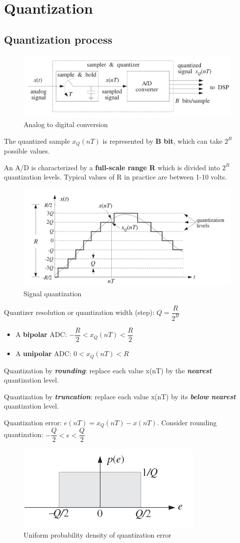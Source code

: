\section{Quantization}
\subsection{Quantization process}
\begin{figure}[h!]
    \centering
    \includegraphics[width=0.5\linewidth]{img/17.png}
    \caption{Analog to digital conversion}
\end{figure}
The quantized sample $x_Q(nT)$ is represented by \textbf{B bit}, which can take $2^B$ possible values. 

An A/D is characterized by a \textbf{full-scale range R} which is divided into $2^B$ quantization levels. Typical values of R in practice are between 1-10 volts.
\begin{figure}[h!]
    \centering
    \includegraphics[width=0.5\linewidth]{img/18.png}
    \caption{Signal quantization}
\end{figure}

Quantizer resolution or quantization width (step): $Q = \dfrac{R}{2^B}$
\begin{itemize}
    \item A \textbf{bipolar} ADC: $-\dfrac{R}{2}<x_Q(nT)<\dfrac{R}{2}$
    \item A \textbf{unipolar} ADC: $0<x_Q(nT)<R$
\end{itemize}

Quantization by \textbf{\textit{rounding}}: replace each value x(nT) by the \textbf{\textit{nearest}} quantization level. 

Quantization by \textbf{\textit{truncation}}: replace each value x(nT) by its \textbf{\textit{below nearest}} quantization level.

Quantization error: $e(nT) = x_Q (nT) - x(nT)$. Consider rounding quantization: $-\dfrac{Q}{2}<e<\dfrac{Q}{2}$
\begin{figure}[h!]
    \centering
    \includegraphics[width=0.3\linewidth]{img/19.png}
    \caption{Uniform probability density of quantization error}
\end{figure}

